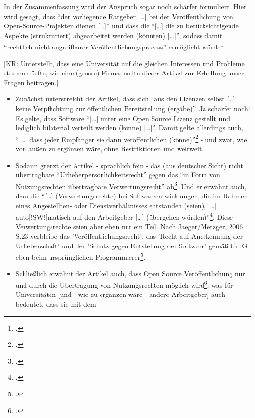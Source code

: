 \documentclass[DIV=calc,BCOR=5mm,11pt,headings=small,oneside,abstract=true, toc=bib]{scrartcl}
\begin{document}
In der Zusammenfassung wird der Anspruch sogar noch schärfer formuliert. Hier
wird gesagt, dass \enquote{der vorliegende Ratgeber [\ldots] bei der
Veröffentlichung von Open-Source-Projekten dienen [\ldots]} und dass die
\enquote{[\ldots] die zu berücksichtigende Aspekte (strukturiert)
abgearbeitet werden (könnten) [\ldots]}, sodass damit
\enquote{rechtlich nicht angreifbarer Veröffentlichungsprozess} ermöglicht
würde\footcite[vgl.][186]{BreGlaGra2008a}

 [KR: Unterstellt, dass eine Universität auf die gleichen Interessen
und Probleme stossen dürfte, wie eine (grosse) Firma, sollte dieser Artikel zur Erhellung
unser Fragen beitragen.]

\begin{itemize}
  \item Zunächst unterstreicht der Artikel, dass sich \enquote{aus den Lizenzen
  selbst [\ldots] keine Verpflichtung zur öffentlichen Bereitstellung
  (ergäbe)}. Ja schärfer noch: Es gelte, dass Software \enquote{[\ldots]
  unter eine Open Source Lizenz gestellt und lediglich bilaterial verteilt
  werden (könne) [\ldots]}. Damit gelte allerdings auch, \enquote{[\ldots]
  dass jeder Empfänger sie dann veröffentlichen
  (könne)}\footcite[vgl.][170]{BreGlaGra2008a} - und zwar, wie von außen
  zu ergänzen wäre, ohne Restriktionen und weltweit.
  \item Sodann grenzt der Artikel - sprachlich fein - das (aus deutscher Sicht)
  nicht übertragbare \enquote{Urheberpersönlichkeitsrecht} gegen das
  \enquote{in Form von Nutzungsrechten übertragbare Verwertungsrecht}
  ab\footcite[vgl.][173]{BreGlaGra2008a}. Und er erwähnt auch, dass die
  \enquote{[\ldots] (Verwertungsrechte) bei Softwareentwicklungen, die im Rahmen
  eines Angestellten- oder Dienstverhältnisses entstanden (seien), [\ldots]
  auto[!SW!]matisch auf den Arbeitgeber [\ldots] (übergehen
  würden)}\footcite[vgl.][173f]{BreGlaGra2008a}. Diese Verwertungsrechte
  seien aber eben nur ein Teil. Nach Jaeger/Metzger, 2006 S.23 verbleibe das
  'Veröffentlichungsrecht', das 'Recht auf Anerkennung der Urheberschaft' und
  der 'Schutz gegen Entstellung der Software' gemäß UrhG eben beim
  ursprünglichen Programmierer\footcite[vgl.][174]{BreGlaGra2008a}.
  \item Schließlich erwähnt der Artikel auch, dass Open Source Veröffentlichung
  nur und durch die Übertragung von Nutzungsrechten möglich
  wird\footcite[vgl.][175]{BreGlaGra2008a}, was für Universitäten [und -
  wie zu ergänzen wäre - andere Arbeitgeber] auch bedeutet, dass sie mit dem

\end{itemize}
\end{document}
